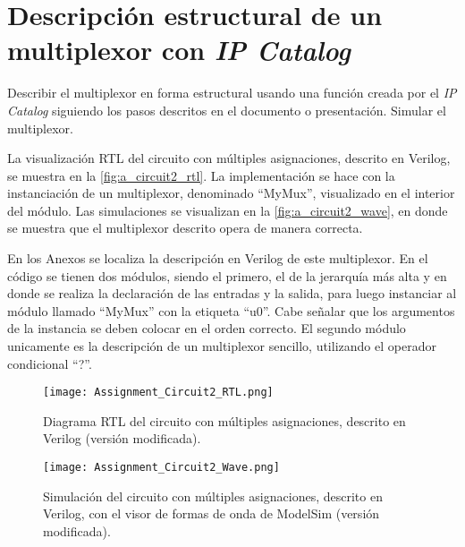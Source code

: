 \section{Descripción estructural de un multiplexor con \textit{IP Catalog} \label{sec:s2}}

\begin{center}
	\begin{minipage}{12cm}
		\begin{tcolorbox}[title=Actividad 2]
			Describir el multiplexor en forma estructural usando una función creada por el \textit{IP Catalog} siguiendo los pasos descritos en el documento o presentación. Simular el multiplexor.
		\end{tcolorbox}	
	\end{minipage}
\end{center}

La visualización RTL del circuito con múltiples asignaciones, descrito en Verilog, se muestra en la \autoref{fig:a_circuit2_rtl}. La implementación se hace con la instanciación de un multiplexor, denominado ``MyMux'', visualizado en el interior del módulo. Las simulaciones se visualizan en la \autoref{fig:a_circuit2_wave}, en donde se muestra que el multiplexor descrito opera de manera correcta.

En los Anexos se localiza la descripción en Verilog de este multiplexor. En el código se tienen dos módulos, siendo el primero, el de la jerarquía más alta y en donde se realiza la declaración de las entradas y la salida, para luego instanciar al módulo llamado ``MyMux'' con la etiqueta ``u0''. Cabe señalar que los argumentos de la instancia se deben colocar en el orden correcto. El segundo módulo unicamente es la descripción de un multiplexor sencillo, utilizando el operador condicional ``?''.

\begin{figure}[ht]
	\centering
	\texttt{[image: Assignment\_Circuit2\_RTL.png]}
	\caption{Diagrama RTL del circuito con múltiples asignaciones, descrito en Verilog (versión modificada). \label{fig:a_circuit2_rtl}}
\end{figure}

\begin{figure}[ht]
	\centering
	\texttt{[image: Assignment\_Circuit2\_Wave.png]}
	\caption{Simulación del circuito con múltiples asignaciones, descrito en Verilog, con el visor de formas de onda de ModelSim (versión modificada). \label{fig:a_circuit2_wave}}
\end{figure}